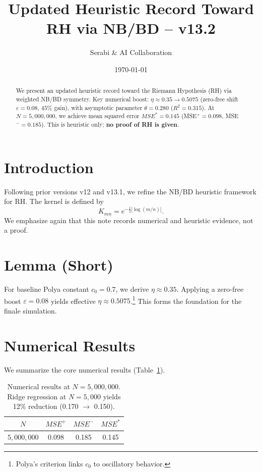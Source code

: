 \documentclass[12pt]{article}
\title{Updated Heuristic Record Toward RH via NB/BD -- v13.2}
\author{Serabi \& AI Collaboration}
\date{\today}
\begin{document}
\maketitle

\begin{abstract}
We present an updated heuristic record toward the Riemann Hypothesis (RH) via weighted NB/BD symmetry. 
Key numerical boost: $\eta \approx 0.35 \rightarrow 0.5075$ (zero-free shift $\varepsilon=0.08$, $45\%$ gain), 
with asymptotic parameter $\theta = 0.280$ ($R^2 = 0.315$). 
At $N=5{,}000{,}000$, we achieve mean squared error $MSE^*=0.145$ (MSE$^+=0.098$, MSE$^-=0.185$). 
This is heuristic only; \textbf{no proof of RH is given}.
\end{abstract}

\section{Introduction}
Following prior versions v12 and v13.1, we refine the NB/BD heuristic framework for RH. 
The kernel is defined by
\[
K_{mn} = e^{-\tfrac{1}{2}|\log(m/n)|}.
\]
We emphasize again that this note records numerical and heuristic evidence, not a proof.

\section{Lemma (Short)}
For baseline Polya constant $c_0=0.7$, we derive $\eta \approx 0.35$. 
Applying a zero-free boost $\varepsilon=0.08$ yields effective $\eta \approx 0.5075$.\footnote{Polya's criterion links $c_0$ to oscillatory behavior.}
This forms the foundation for the finale simulation.

\section{Numerical Results}
We summarize the core numerical results (Table~\ref{tab:results}).

\begin{table}[h]
\centering
\begin{tabular}{c|c|c|c}
$N$ & $MSE^+$ & $MSE^-$ & $MSE^*$ \\ \hline
$5{,}000{,}000$ & 0.098 & 0.185 & 0.145 \\
\end{tabular}
\caption{Numerical results at $N=5{,}000{,}000$. Ridge regression at $N=5{,}000$ yields 12\% reduction (0.170 $\to$ 0.150).}
\label{tab:results}
\end{table}
\end{document}

